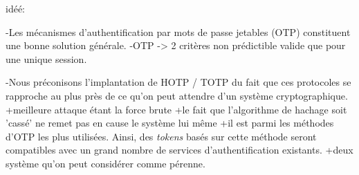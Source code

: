 \documentclass{../res/univ-projet}
\begin{document}
idéé:

-Les mécanismes d'authentification par mots de passe jetables (OTP) constituent une bonne solution générale.
-OTP -> 2 critères non prédictible valide que pour une unique session.

-Nous préconisons l'implantation de HOTP / TOTP du fait que ces protocoles se rapproche au plus près de ce qu'on peut
attendre d'un système cryptographique. 
  +meilleure attaque étant la force brute
  +le fait que l'algorithme de hachage soit 'cassé' ne remet pas en cause le système lui même
  +il est parmi les m\'ethodes d'OTP les plus utilis\'ees. Ainsi, des \emph{tokens} bas\'es sur cette m\'ethode 
  seront compatibles avec un grand nombre de services d'authentification existants.
  +deux système qu'on peut considérer comme pérenne.
  
  
\end{document}
